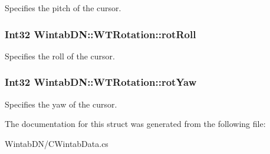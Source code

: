 Specifies the pitch of the cursor. 

\hypertarget{struct_wintab_d_n_1_1_w_t_rotation_a4d9c8754968c56887219363857ab8afb}{
\subsubsection[{rotRoll}]{\setlength{\rightskip}{0pt plus 5cm}Int32 {\bf WintabDN::WTRotation::rotRoll}}}
\label{struct_wintab_d_n_1_1_w_t_rotation_a4d9c8754968c56887219363857ab8afb}


Specifies the roll of the cursor. 

\hypertarget{struct_wintab_d_n_1_1_w_t_rotation_a4798ee04e0f69f0038ac76c04002b350}{
\subsubsection[{rotYaw}]{\setlength{\rightskip}{0pt plus 5cm}Int32 {\bf WintabDN::WTRotation::rotYaw}}}
\label{struct_wintab_d_n_1_1_w_t_rotation_a4798ee04e0f69f0038ac76c04002b350}


Specifies the yaw of the cursor. 



The documentation for this struct was generated from the following file:\begin{DoxyCompactItemize}
\item 
WintabDN/CWintabData.cs\end{DoxyCompactItemize}
